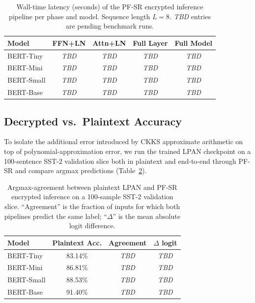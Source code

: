 \begin{table}[htbp]
\centering
\caption{Wall-time latency (seconds) of the PF-SR encrypted inference pipeline per phase and model. Sequence length $L = 8$. \textit{TBD} entries are pending benchmark runs.}
\label{tab:pfsr_latency}
\begin{tabular}{lcccc}
\toprule
\textbf{Model} & \textbf{FFN+LN} & \textbf{Attn+LN} & \textbf{Full Layer} & \textbf{Full Model} \\
\midrule
BERT-Tiny  & \textit{TBD} & \textit{TBD} & \textit{TBD} & \textit{TBD} \\
BERT-Mini  & \textit{TBD} & \textit{TBD} & \textit{TBD} & \textit{TBD} \\
BERT-Small & \textit{TBD} & \textit{TBD} & \textit{TBD} & \textit{TBD} \\
BERT-Base  & \textit{TBD} & \textit{TBD} & \textit{TBD} & \textit{TBD} \\
\bottomrule
\end{tabular}
\end{table}

\subsection{Decrypted vs.\ Plaintext Accuracy}
To isolate the additional error introduced by CKKS approximate arithmetic on top of polynomial-approximation error, we run the trained LPAN checkpoint on a 100-sentence SST-2 validation slice both in plaintext and end-to-end through PF-SR and compare argmax predictions (Table~\ref{tab:pfsr_accuracy}).

\begin{table}[htbp]
\centering
\caption{Argmax-agreement between plaintext LPAN and PF-SR encrypted inference on a 100-sample SST-2 validation slice. ``Agreement'' is the fraction of inputs for which both pipelines predict the same label; ``$\Delta$'' is the mean absolute logit difference.}
\label{tab:pfsr_accuracy}
\begin{tabular}{lccc}
\toprule
\textbf{Model} & \textbf{Plaintext Acc.} & \textbf{Agreement} & \textbf{$\Delta$ logit} \\
\midrule
BERT-Tiny  & 83.14\% & \textit{TBD} & \textit{TBD} \\
BERT-Mini  & 86.81\% & \textit{TBD} & \textit{TBD} \\
BERT-Small & 88.53\% & \textit{TBD} & \textit{TBD} \\
BERT-Base  & 91.40\% & \textit{TBD} & \textit{TBD} \\
\bottomrule
\end{tabular}
\end{table}

